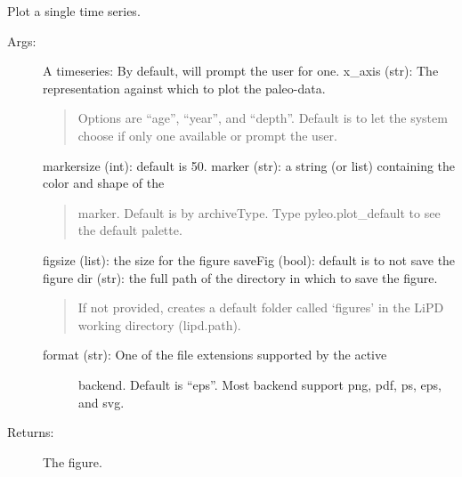 \documentclass[letterpaper,10pt,english]{sphinxmanual}
\begin{document}
\begin{fulllineitems}
\label{\detokenize{Main:pyleoclim.plotTs}}
Plot a single time series.
\begin{description}
\item[{Args:}] \leavevmode
A timeseries: By default, will prompt the user for one.
x\_axis (str): The representation against which to plot the paleo-data.
\begin{quote}

Options are “age”, “year”, and “depth”. Default is to let the
system choose if only one available or prompt the user.
\end{quote}

markersize (int): default is 50.
marker (str): a string (or list) containing the color and shape of the
\begin{quote}

marker. Default is by archiveType. Type pyleo.plot\_default to see
the default palette.
\end{quote}

figsize (list): the size for the figure
saveFig (bool): default is to not save the figure
dir (str): the full path of the directory in which to save the figure.
\begin{quote}

If not provided, creates a default folder called ‘figures’ in the
LiPD working directory (lipd.path).
\end{quote}
\begin{description}
\item[{format (str): One of the file extensions supported by the active}] \leavevmode
backend. Default is “eps”. Most backend support png, pdf, ps, eps,
and svg.

\end{description}

\item[{Returns:}] \leavevmode
The figure.

\end{description}

\end{fulllineitems}

\end{document}
